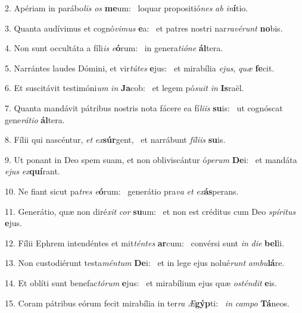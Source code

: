 2. Apériam in parábo\textit{lis} \textit{os} \textbf{me}um: \ast\  loquar propositió\textit{nes} \textit{ab} \textit{in}\textbf{í}tio.\

3. Quanta audívimus et cognó\textit{vi}\textit{mus} \textbf{e}a: \ast\  et patres nostri nar\textit{ra}\textit{vé}\textit{runt} \textbf{no}bis.\

4. Non sunt occultáta a fíli\textit{is} \textit{e}\textbf{ó}rum: \ast\  in genera\textit{ti}\textit{ó}\textit{ne} \textbf{ál}tera.\

5. Narrántes laudes Dómini, et vir\textit{tú}\textit{tes} \textbf{e}jus: \ast\  et mirabília \textit{e}\textit{jus}, \textit{quæ} \textbf{fe}cit.\

6. Et suscitávit testimóni\textit{um} \textit{in} \textbf{Ja}cob: \ast\  et legem pó\textit{su}\textit{it} \textit{in} \textbf{Is}raël.\

7. Quanta mandávit pátribus nostris nota fácere ea fí\textit{li}\textit{is} \textbf{su}is: \ast\  ut cognóscat gene\textit{rá}\textit{ti}\textit{o} \textbf{ál}tera.\

8. Fílii qui nascéntur, \textit{et} \textit{ex}\textbf{súr}gent, \ast\  et narrábunt \textit{fí}\textit{li}\textit{is} \textbf{su}is.\

9. Ut ponant in Deo spem suam, et non obliviscántur ó\textit{pe}\textit{rum} \textbf{De}i: \ast\  et mandáta \textit{e}\textit{jus} \textit{ex}\textbf{quí}rant.\

10. Ne fiant sicut pa\textit{tres} \textit{e}\textbf{ó}rum: \ast\  generátio pra\textit{va} \textit{et} \textit{ex}\textbf{ás}perans.\

11. Generátio, quæ non diré\textit{xit} \textit{cor} \textbf{su}um: \ast\  et non est créditus cum Deo \textit{spí}\textit{ri}\textit{tus} \textbf{e}jus.\

12. Fílii Ephrem intendéntes et mit\textit{tén}\textit{tes} \textbf{ar}cum: \ast\  convérsi sunt \textit{in} \textit{di}\textit{e} \textbf{bel}li.\

13. Non custodiérunt testa\textit{mén}\textit{tum} \textbf{De}i: \ast\  et in lege ejus nolué\textit{runt} \textit{am}\textit{bu}\textbf{lá}re.\

14. Et oblíti sunt benefac\textit{tó}\textit{rum} \textbf{e}jus: \ast\  et mirabílium ejus quæ \textit{os}\textit{tén}\textit{dit} \textbf{e}is.\

15. Coram pátribus eórum fecit mirabília in ter\textit{ra} \textit{Æ}\textbf{gýp}ti: \ast\  \textit{in} \textit{cam}\textit{po} \textbf{Tá}neos.\

